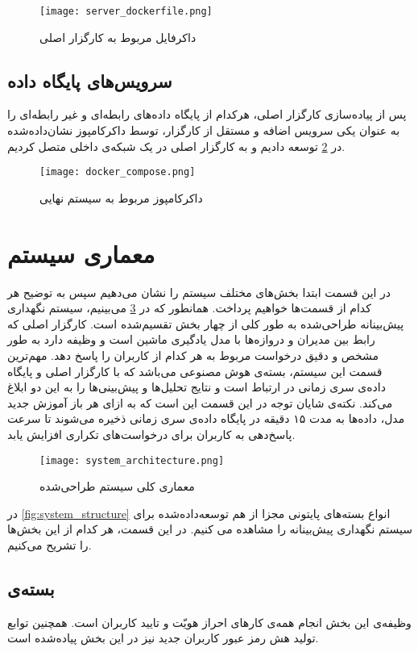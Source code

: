 \begin{figure}[!h]
\centerline{\texttt{[image: server\_dockerfile.png]}}
\caption{داکرفایل مربوط به کارگزار اصلی}
\label{fig:server_dockerfile}
\end{figure}

\subsection{سرویس‌های پایگاه داده}
پس از پیاده‌سازی کارگزار اصلی، هرکدام از پایگاه‌ داده‌های رابطه‌ای و غیر رابطه‌ای را به عنوان یکی سرویس اضافه و مستقل از کارگزار، توسط داکرکامپوز نشان‌داده‌‌شده در \cref{fig:docker_compose} توسعه دادیم و به کارگزار اصلی در یک شبکه‌ی داخلی متصل کردیم.

\begin{figure}[!h]
\centerline{\texttt{[image: docker\_compose.png]}}
\caption{داکرکامپوز مربوط به سیستم نهایی}
\label{fig:docker_compose}
\end{figure}


\section{معماری سیستم}
در این قسمت ابتدا بخش‌های مختلف سیستم را نشان می‌دهیم سپس به توضیح هر کدام از قسمت‌ها خواهیم پرداخت. همانطور که در \cref{fig:system_architecture} می‌بینیم، سیستم نگهداری پیش‌بینانه طراحی‌شده به طور کلی از چهار بخش تقسیم‌شده است. کارگزار اصلی که رابط بین مدیران و دروازه‌ها با مدل یادگیری ماشین است و وظیفه‌ دارد به طور مشخص و دقیق درخواست مربوط به هر کدام از کاربران را پاسخ دهد. مهم‌ترین قسمت این سیستم، بسته‌ی هوش مصنوعی می‌باشد که با کارگزار اصلی و پایگاه‌ داده‌ی سری زمانی در ارتباط است و نتایج تحلیل‌ها و پیش‌بینی‌ها را به این دو ابلاغ می‌کند. نکته‌ی شایان توجه در این قسمت این است که به ازای هر باز آموزش جدید مدل، داده‌ها به مدت ۱۵ دقیقه در پایگاه‌ داده‌ی سری زمانی ذخیره می‌شوند تا سرعت پاسخ‌دهی به کاربران برای درخواست‌های تکراری افزایش یابد.

\begin{figure}[!h]
\centerline{\texttt{[image: system\_architecture.png]}}
\caption{معماری کلی سیستم طراحی‌شده}
\label{fig:system_architecture}
\end{figure}


در \cref{fig:system_structure} انواع بسته‌های پایتونی مجزا از هم توسعه‌داده‌شده برای سیستم نگهداری پیش‌بینانه را مشاهده می کنیم. در این قسمت، هر کدام از این بخش‌ها را تشریح می‌کنیم.

\subsection{بسته‌ی }
وظیفه‌ی این بخش انجام همه‌ی کارهای احراز هویّت و تایید کاربران است. همچنین توابع تولید هش رمز عبور کاربران جدید نیز در این بخش پیاد‌ه‌شده است.

